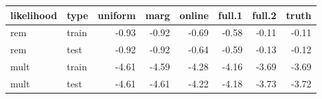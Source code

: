 \begin{table}[ht]
\begin{center}
\begin{tabular}{llrrrrrr}
  \hline
likelihood & type & uniform & marg & online & full.1 & full.2 & truth \\ 
  \hline
rem & train & -0.93 & -0.92 & -0.69 & -0.58 & -0.11 & -0.11 \\ 
  rem & test & -0.92 & -0.92 & -0.64 & -0.59 & -0.13 & -0.12 \\ 
  mult & train & -4.61 & -4.59 & -4.28 & -4.16 & -3.69 & -3.69 \\ 
  mult & test & -4.61 & -4.61 & -4.22 & -4.18 & -3.73 & -3.72 \\ 
   \hline
\end{tabular}
\end{center}
\end{table}
